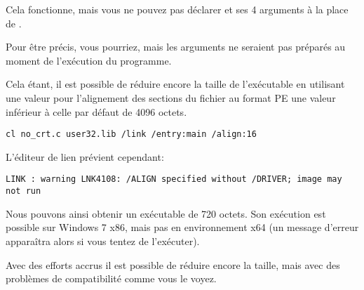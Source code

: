 Cela fonctionne, mais vous ne pouvez pas déclarer  et ses 4 arguments à la place de 
\main{}.

Pour être précis, vous pourriez, mais les arguments ne seraient pas préparés au moment de 
l'exécution du programme.

Cela étant, il est possible de réduire encore la taille de l'exécutable en utilisant une valeur 
pour l'alignement des sections du fichier au format \ac{PE} une valeur inférieur à celle par 
défaut de 4096 octets.

\begin{lstlisting}
cl no_crt.c user32.lib /link /entry:main /align:16
\end{lstlisting}

L'éditeur de lien prévient cependant:

\begin{lstlisting}
LINK : warning LNK4108: /ALIGN specified without /DRIVER; image may not run
\end{lstlisting}

Nous pouvons ainsi obtenir un exécutable de 720 octets.
Son exécution est possible sur Windows 7 x86, mais pas en environnement x64 
(un message d'erreur apparaîtra alors si vous tentez de l'exécuter).

Avec des efforts accrus il est possible de réduire encore la taille, mais avec des problèmes de
compatibilité comme vous le voyez.
